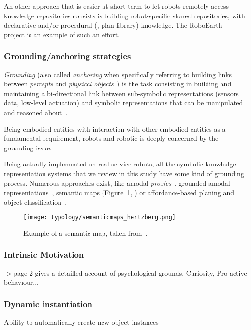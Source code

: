 An other approach that is easier at short-term to let robots remotely access
knowledge repositories consists is building robot-specific shared repositories,
with declarative and/or procedural (\ie, plan library) knowledge. The
RoboEarth~\cite{Waibel2011} project is an example of such an effort.

\subsubsection{Grounding/anchoring strategies}
\label{sect|grounding}

\emph{Grounding} (also called \emph{anchoring} when specifically referring to
building links between \emph{percepts} and \emph{physical
objects}~\cite{Coradeschi2003}) is the task consisting in building and
maintaining a bi-directional link between sub-symbolic representations (sensors
data, low-level actuation) and symbolic representations that can be
manipulated and reasoned about~\cite{Harnad1990}.

Being embodied entities with interaction with other embodied entities as a
fundamental requirement, robots and robotic is deeply concerned by the
grounding issue.

Being actually implemented on real service robots, all the symbolic knowledge
representation systems that we review in this study have some kind of grounding
process. Numerous approaches exist, like amodal
\emph{proxies}~\cite{Jacobsson2008}, grounded amodal
representations~\cite{Alami2011, Mavridis2006}, semantic maps
(Figure~\ref{fig|semanticmap}, \cite{Nuechter2008, Galindo2008,Blodow2011}) or
affordance-based planing and object classification~\cite{Lorken2008,
Varadarajan2011}.

\begin{figure}
    \centering
    \texttt{[image: typology/semanticmaps\_hertzberg.png]}
    \caption{Example of a semantic map, taken from~\cite{Nuechter2008}.}
    \label{fig|semanticmap}
\end{figure}

\subsubsection{Intrinsic Motivation}

\cite{Oudeyer2007} -> page 2 gives a detailled account of psychological grounds.
Curiosity, Pro-active behaviour...

\subsubsection{Dynamic instantiation}
\label{sect|new-instances}
Ability to automatically create new object instances

